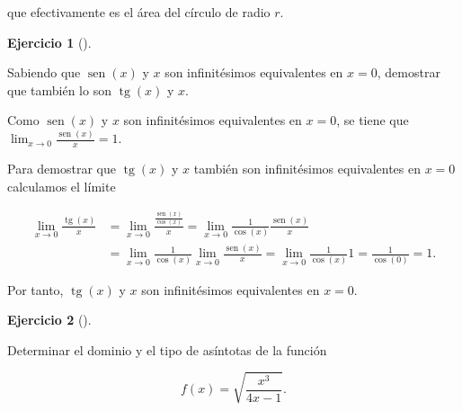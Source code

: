 \documentclass[
  spanish,
  a4paper,
]{scrreport}
\theoremstyle{definition}
\newtheorem{exercise}{Ejercicio}[chapter]
\theoremstyle{remark}
\begin{document}
\begin{tcolorbox}
\begin{enumerate}
  que efectivamente es el área del círculo de radio \(r\).
\end{enumerate}

\end{tcolorbox}

\begin{exercise}[]\protect\hypertarget{exr-3}{}\label{exr-3}

Sabiendo que \(\operatorname{sen}(x)\) y \(x\) son infinitésimos
equivalentes en \(x=0\), demostrar que también lo son
\(\operatorname{tg}(x)\) y \(x\).

\end{exercise}

\begin{tcolorbox}[enhanced jigsaw, arc=.35mm, bottomrule=.15mm, bottomtitle=1mm, breakable, colback=white, colbacktitle=quarto-callout-tip-color!10!white, colframe=quarto-callout-tip-color-frame, coltitle=black, left=2mm, leftrule=.75mm, opacityback=0, opacitybacktitle=0.6, rightrule=.15mm, title=\textcolor{quarto-callout-tip-color}{\faLightbulb}\hspace{0.5em}{Solución}, titlerule=0mm, toprule=.15mm, toptitle=1mm]

Como \(\operatorname{sen}(x)\) y \(x\) son infinitésimos equivalentes en
\(x=0\), se tiene que
\(\lim_{x\to 0}\frac{\operatorname{sen}(x)}{x} = 1\).

Para demostrar que \(\operatorname{tg}(x)\) y \(x\) también son
infinitésimos equivalentes en \(x=0\) calculamos el límite

\begin{align*}
\lim_{x\to 0}\frac{\operatorname{tg}(x)}{x} &= \lim_{x\to 0}\frac{\frac{\operatorname{sen}(x)}{\cos(x)}}{x} = \lim_{x\to 0}\frac{1}{\cos(x)}\frac{\operatorname{sen}(x)}{x} \\
&= \lim_{x\to 0}\frac{1}{\cos(x)}\lim_{x\to 0}\frac{\operatorname{sen}(x)}{x} = \lim_{x\to 0}\frac{1}{\cos(x)} 1 = \frac{1}{\cos(0)} = 1.
\end{align*}

Por tanto, \(\operatorname{tg}(x)\) y \(x\) son infinitésimos
equivalentes en \(x=0\).

\end{tcolorbox}

\begin{exercise}[]\protect\hypertarget{exr-4}{}\label{exr-4}

Determinar el dominio y el tipo de asíntotas de la función

\[f(x)=\sqrt{\frac{x^3}{4x-1}}.\]

\end{exercise}
\end{document}
